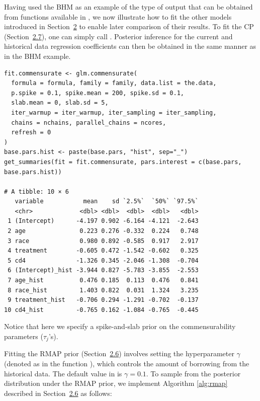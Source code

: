 Having used the BHM as an example of the type of output that can be obtained from functions available in , we now illustrate how to fit the other models introduced in Section~\hyperref[sec:priorelicit]{2} to enable later comparison of their results. To fit the CP (Section~\hyperref[sec:cp]{2.7}), one can simply call . Posterior inference for the current and historical data regression coefficients can then be obtained in the same manner as in the BHM example.

\begin{verbatim}
fit.commensurate <- glm.commensurate(
  formula = formula, family = family, data.list = the.data,
  p.spike = 0.1, spike.mean = 200, spike.sd = 0.1,
  slab.mean = 0, slab.sd = 5,
  iter_warmup = iter_warmup, iter_sampling = iter_sampling,
  chains = nchains, parallel_chains = ncores,
  refresh = 0
)
base.pars.hist <- paste(base.pars, "hist", sep="_")
get_summaries(fit = fit.commensurate, pars.interest = c(base.pars, base.pars.hist))

# A tibble: 10 × 6
   variable           mean    sd `2.5%`  `50%` `97.5%`
   <chr>             <dbl> <dbl>  <dbl>  <dbl>   <dbl>
 1 (Intercept)      -4.197 0.902 -6.164 -4.121  -2.643
 2 age               0.223 0.276 -0.332  0.224   0.748
 3 race              0.980 0.892 -0.585  0.917   2.917
 4 treatment        -0.605 0.472 -1.542 -0.602   0.325
 5 cd4              -1.326 0.345 -2.046 -1.308  -0.704
 6 (Intercept)_hist -3.944 0.827 -5.783 -3.855  -2.553
 7 age_hist          0.476 0.185  0.113  0.476   0.841
 8 race_hist         1.403 0.822  0.031  1.324   3.235
 9 treatment_hist   -0.706 0.294 -1.291 -0.702  -0.137
10 cd4_hist         -0.765 0.162 -1.084 -0.765  -0.445
\end{verbatim}
Notice that here we specify a spike-and-slab prior on the commensurability parameters ($\tau_j$'s).

Fitting the RMAP prior (Section~\hyperref[sec:RMAP]{2.6}) involves setting the hyperparameter $\gamma$ (denoted as  in the function ), which controls the amount of borrowing from the historical data. The default value in  is $\gamma=0.1$. To sample from the posterior distribution under the RMAP prior, we implement Algorithm \ref{alg:rmap} described in Section~\hyperref[sec:RMAP]{2.6} as follows:

